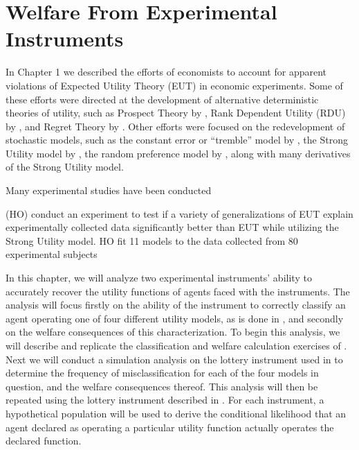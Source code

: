 \documentclass[../main.tex]{subfiles}
\begin{document}
\onehalfspacing
\setcounter{chapter}{3}

\chapter{Welfare From Experimental Instruments}

\lltoc %

In Chapter 1 we described the efforts of economists to account for apparent violations of Expected Utility Theory (EUT) in economic experiments.
Some of these efforts were directed at the development of alternative deterministic theories of utility, such as Prospect Theory by \textcite{Kahneman1979}, Rank Dependent Utility (RDU) by \textcite{Quiggin1982}, and Regret Theory by \textcite{Bell1982;Loomes1982}.
Other efforts were focused on the redevelopment of stochastic models, such as the constant error or \enquote{tremble} model by \textcite{Harless1994}, the Strong Utility model by \textcite{Hey1994}, the random preference model by \textcite{Loomes1995}, along with many derivatives of the Strong Utility model.

Many experimental studies have been conducted

\textcite{Hey1994} (HO) conduct an experiment to test if a variety of generalizations of EUT explain experimentally collected data significantly better than EUT while utilizing the Strong Utility model.
HO fit 11 models to the data collected from 80 experimental subjects










In this chapter, we will analyze two experimental instruments' ability to accurately recover the utility functions of agents faced with the instruments.
The analysis will focus firstly on the ability of the instrument to correctly classify an agent operating one of four different utility models, as is done in \textcite{Harrison2016}, and secondly on the welfare consequences of this characterization.
To begin this analysis, we will describe and replicate the classification and welfare calculation exercises of \textcite{Harrison2016}.
Next we will conduct a simulation analysis on the lottery instrument used in \textcite{Harrison2016} to determine the frequency of misclassification for each of the four models in question, and the welfare consequences thereof.
This analysis will then be repeated using the lottery instrument described in \textcite{Hey1994}.
For each instrument, a hypothetical population will be used to derive the conditional likelihood that an agent declared as operating a particular utility function actually operates the declared function.
\end{document}

